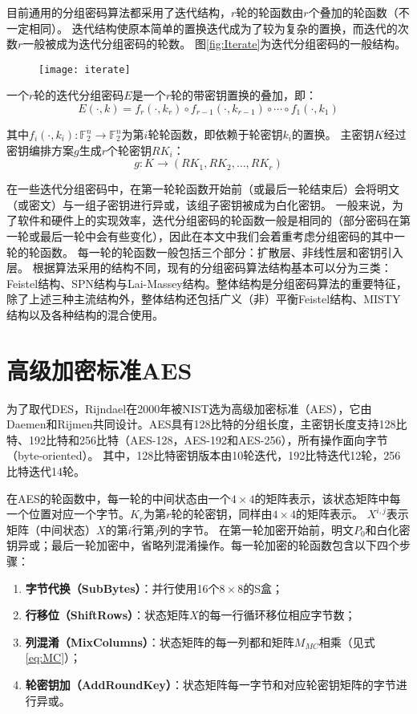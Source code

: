 目前通用的分组密码算法都采用了迭代结构，$r$轮的轮函数由$r$个叠加的轮函数（不一定相同）。
迭代结构使原本简单的置换迭代成为了较为复杂的置换，而迭代的次数$r$一般被成为迭代分组密码的轮数。
图\ref{fig:Iterate}为迭代分组密码的一般结构。
\begin{figure}
    \centering
    \texttt{[image: iterate]}
\end{figure}
\begin{defn}[迭代分组密码]
    一个$r$轮的迭代分组密码$E$是一个$r$轮的带密钥置换的叠加，即：
    $$E(\cdot,k)=f_r(\cdot,k_r)\circ f_{r-1}(\cdot,k_{r-1})\circ\cdots\circ f_1(\cdot,k_1)$$
\end{defn}
其中$f_i(\cdot,k_i):\mathbb{F}^n_2\rightarrow\mathbb{F}^n_2$为第$i$轮轮函数，即依赖于轮密钥$k_i$的置换。
主密钥$K$经过密钥编排方案$g$生成$r$个轮密钥$RK_i$：
$$g:K\rightarrow(RK_1,RK_2,\dots,RK_r)$$

在一些迭代分组密码中，在第一轮轮函数开始前（或最后一轮结束后）会将明文（或密文）与一组子密钥进行异或，该组子密钥被成为白化密钥。
一般来说，为了软件和硬件上的实现效率，迭代分组密码的轮函数一般是相同的（部分密码在第一轮或最后一轮中会有些变化），因此在本文中我们会着重考虑分组密码的其中一轮的轮函数。
每一轮的轮函数一般包括三个部分：扩散层、非线性层和密钥引入层。
根据算法采用的结构不同，现有的分组密码算法结构基本可以分为三类：Feistel结构、SPN结构与Lai-Massey结构。整体结构是分组密码算法的重要特征，除了上述三种主流结构外，整体结构还包括广义（非）平衡Feistel结构、MISTY结构以及各种结构的混合使用。

\section{高级加密标准AES}
为了取代DES，Rijndael在2000年被NIST选为高级加密标准（AES），它由Daemen和Rijmen共同设计。AES具有128比特的分组长度，主密钥长度支持128比特、192比特和256比特（AES-128，AES-192和AES-256），所有操作面向字节（byte-oriented）。
其中，128比特密钥版本由10轮迭代，192比特迭代12轮，256比特迭代14轮。

在AES的轮函数中，每一轮的中间状态由一个$4\times 4$的矩阵表示，该状态矩阵中每一个位置对应一个字节。$K_r$为第$r$轮的轮密钥，同样由$4\times 4$的矩阵表示。
$X^{i,j}$表示矩阵（中间状态）$X$的第$i$行第$j$列的字节。
在第一轮加密开始前，明文$P_0$和白化密钥异或；最后一轮加密中，省略列混淆操作。每一轮加密的轮函数包含以下四个步骤：
\begin{enumerate}
    \item \textbf{字节代换（SubBytes）}：并行使用16个$8\times 8$的S盒；
    \item \textbf{行移位（ShiftRows）}：状态矩阵$X$的每一行循环移位相应字节数；
    \item \textbf{列混淆（MixColumns）}：状态矩阵的每一列都和矩阵$M_{MC}$相乘（见式\ref{eq:MC}）；
    \item \textbf{轮密钥加（AddRoundKey）}：状态矩阵每一字节和对应轮密钥矩阵的字节进行异或。
\end{enumerate}

